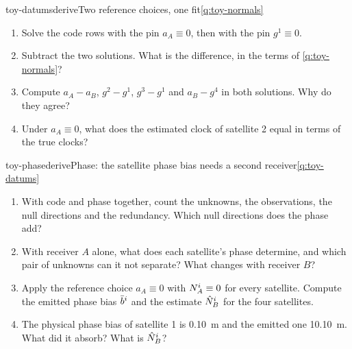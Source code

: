 \begin{question}{toy-datums}{derive}{Two reference choices, one fit}{\ref{q:toy-normals}}
\begin{enumerate}[leftmargin=*, itemsep=1pt]
\item Solve the code rows with the pin $a_A \equiv 0$, then with the pin
      $g^1 \equiv 0$.
\item Subtract the two solutions. What is the difference, in the terms of
      \cref{q:toy-normals}?
\item Compute $a_A - a_B$, $g^2 - g^1$, $g^3 - g^1$ and $a_B - g^4$ in both
      solutions. Why do they agree?
\item Under $a_A \equiv 0$, what does the estimated clock of satellite 2 equal in
      terms of the true clocks?
\end{enumerate}
\end{question}

\begin{question}{toy-phase}{derive}{Phase: the satellite phase bias needs a second receiver}{\ref{q:toy-datums}}
\begin{enumerate}[leftmargin=*, itemsep=1pt]
\item With code and phase together, count the unknowns, the observations, the
      null directions and the redundancy. Which null directions does the phase
      add?
\item With receiver $A$ alone, what does each satellite's phase determine, and
      which pair of unknowns can it not separate? What changes with receiver $B$?
\item Apply the reference choice $a_A \equiv 0$ with $N^i_A \equiv 0$ for every
      satellite. Compute the emitted phase bias $\bar b^i$ and the estimate
      $\hat N^i_B$ for the four satellites.
\item The physical phase bias of satellite 1 is 0.10~m and the emitted one
      10.10~m. What did it absorb? What is $\hat N^i_B$?
\end{enumerate}
\end{question}

